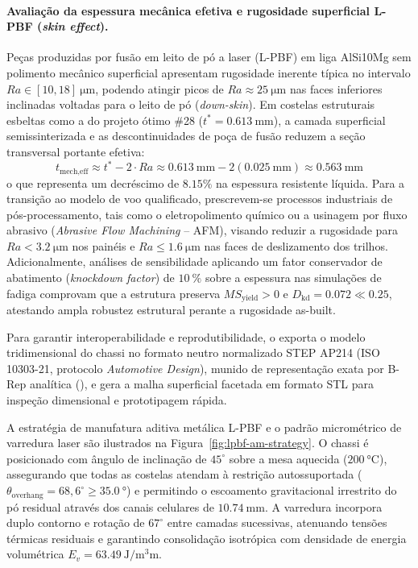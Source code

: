 \paragraph*{Avaliação da espessura mecânica efetiva e rugosidade superficial L-PBF (\textit{skin effect}).}
Peças produzidas por fusão em leito de pó a laser (L-PBF) em liga AlSi10Mg sem polimento mecânico superficial apresentam rugosidade inerente típica no intervalo $Ra \in [\num{10}, \num{18}]\ \si{\micro\metre}$, podendo atingir picos de $Ra \approx \SI{25}{\micro\metre}$ nas faces inferiores inclinadas voltadas para o leito de pó (\textit{down-skin}). Em costelas estruturais esbeltas como a do projeto ótimo \#28 ($t^* = \SI{0.613}{\milli\metre}$), a camada superficial semissinterizada e as descontinuidades de poça de fusão reduzem a seção transversal portante efetiva:
\begin{equation}
  t_{\text{mech,eff}} \approx t^* - 2 \cdot Ra \approx \SI{0.613}{\milli\metre} - 2(\SI{0.025}{\milli\metre}) \approx \SI{0.563}{\milli\metre}
  \label{eq:t-mech-eff}
\end{equation}
o que representa um decréscimo de $\num{8.15}\%$ na espessura resistente líquida. Para a transição ao modelo de voo qualificado, prescrevem-se processos industriais de pós-processamento, tais como o eletropolimento químico ou a usinagem por fluxo abrasivo (\textit{Abrasive Flow Machining} -- AFM), visando reduzir a rugosidade para $Ra < \SI{3.2}{\micro\metre}$ nos painéis e $Ra \le \SI{1.6}{\micro\metre}$ nas faces de deslizamento dos trilhos. Adicionalmente, análises de sensibilidade aplicando um fator conservador de abatimento (\textit{knockdown factor}) de $\SI{10}{\percent}$ sobre a espessura nas simulações de fadiga comprovam que a estrutura preserva $MS_{\text{yield}} > 0$ e $D_{\text{kd}} = \num{0.072} \ll \num{0.25}$, atestando ampla robustez estrutural perante a rugosidade as-built.

Para garantir interoperabilidade e reprodutibilidade, o  exporta o modelo tridimensional do chassi no formato neutro normalizado STEP AP214 (ISO 10303-21, protocolo \textit{Automotive Design}), munido de representação exata por B-Rep analítica (), e gera a malha superficial facetada em formato STL para inspeção dimensional e prototipagem rápida.

A estratégia de manufatura aditiva metálica L-PBF e o padrão micrométrico de varredura laser são ilustrados na Figura~\ref{fig:lpbf-am-strategy}. O chassi é posicionado com ângulo de inclinação de $45^\circ$ sobre a mesa aquecida ($\SI{200}{\celsius}$), assegurando que todas as costelas atendam à restrição autossuportada ($\theta_{\text{overhang}} = 68{,}6^\circ \ge \SI{35.0}{\degree}$) e permitindo o escoamento gravitacional irrestrito do pó residual através dos canais celulares de $\SI{10.74}{\milli\metre}$. A varredura incorpora duplo contorno e rotação de $67^\circ$ entre camadas sucessivas, atenuando tensões térmicas residuais e garantindo consolidação isotrópica com densidade de energia volumétrica $E_v = \SI{63.49}{\joule\per\cubic\milli\metre}$.

